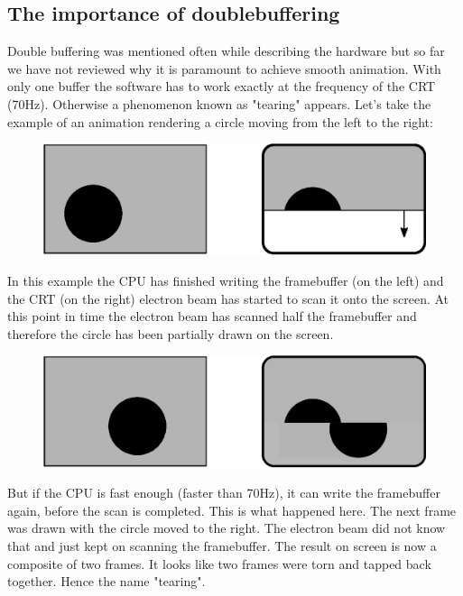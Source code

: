 \documentclass[book.tex]{subfiles}
\begin{document}
\subsection{The importance of doublebuffering}
Double buffering was mentioned often while describing the hardware but so far we have not reviewed why it is paramount to achieve smooth animation. With only one buffer the software has to work exactly at the frequency of the CRT (70Hz). Otherwise a phenomenon known as "tearing" appears. Let's take the example of an animation rendering a circle moving from the left to the right:
\par
\begin{figure}[H]
\centering
\includegraphics[width=\textwidth]{imgs/drawings/doublebuffer_before.eps}
\end{figure}
\par
In this example the CPU has finished writing the framebuffer (on the left) and the CRT (on the right) electron beam has started to scan it onto the screen. At this point in time the electron beam has scanned half the framebuffer and therefore the circle has been partially drawn on the screen.
\par
\begin{figure}[H]
\centering
\includegraphics[width=\textwidth]{imgs/drawings/doublebuffer_after.eps}
\end{figure}
\par
But if the CPU is fast enough (faster than 70Hz), it can write the framebuffer again, before the scan is completed. This is what happened here. The next frame was drawn with the circle moved to the right. The electron beam did not know that and just kept on scanning the framebuffer. The result on screen is now a composite of two frames. It looks like two frames were torn and tapped back together. Hence the name "tearing".\\
\end{document}
